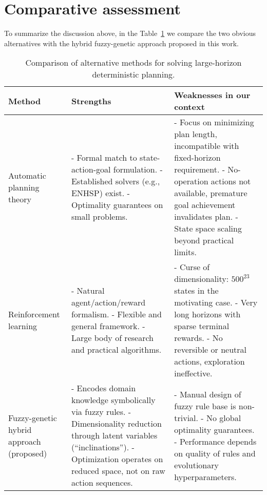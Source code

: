 \documentclass[12pt, a4paper]{report}
\begin{document}
	\section{Comparative assessment}

To summarize the discussion above, in the Table~\ref{table::comparison} we compare the two obvious alternatives with the hybrid fuzzy-genetic approach proposed in this work.

\begin{table}[H]
	\label{table::comparison}
	\centering
	\begin{tabular}{|p{3cm}|p{5cm}|p{6cm}|}
		\hline
		\textbf{Method} & \textbf{Strengths} & \textbf{Weaknesses in our context} \\ \hline
		Automatic planning theory & - Formal match to state-action-goal formulation. \newline - Established solvers (e.g., ENHSP) exist. \newline - Optimality guarantees on small problems. & - Focus on minimizing plan length, incompatible with fixed-horizon requirement. \newline - No-operation actions not available, premature goal achievement invalidates plan. \newline - State space scaling beyond practical limits. \\ \hline
		
		Reinforcement learning & - Natural agent/action/reward formalism. \newline - Flexible and general framework. \newline - Large body of research and practical algorithms. & - Curse of dimensionality: \(500^{23}\) states in the motivating case. \newline - Very long horizons with sparse terminal rewards. \newline - No reversible or neutral actions, exploration ineffective. \\ \hline
		
		Fuzzy-genetic hybrid approach (proposed) & - Encodes domain knowledge symbolically via fuzzy rules. \newline - Dimensionality reduction through latent variables (“inclinations”). \newline - Optimization operates on reduced space, not on raw action sequences. & - Manual design of fuzzy rule base is non-trivial. \newline - No global optimality guarantees. \newline - Performance depends on quality of rules and evolutionary hyperparameters. \\ \hline
	\end{tabular}
	\caption{Comparison of alternative methods for solving large-horizon deterministic planning.}
\end{table}
\end{document}
